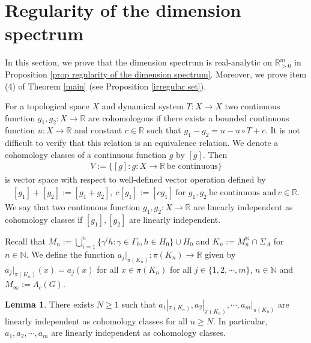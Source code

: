 \documentclass{article}
\theoremstyle{definition}
\newtheorem{lemma}[thm]{Lemma}
\begin{document}
\section{Regularity of the dimension spectrum}\label{Regularity of the dimension spectrum on a open "good" set}
In this section, we prove that the dimension spectrum is real-analytic on $\mathbb{R}_{>0}^m$ in Proposition \ref{prop regularity of the dimension spectrum}. Moreover, we prove item (4) of Theorem \ref{main} (see Proposition \ref{irregular set}). %

For a topological space $X$ and dynamical system $T:X\rightarrow X$ two continuous function $g_1,g_2:X\rightarrow \mathbb{R}$ are cohomologous if there exists a bounded continuous function $u:X\rightarrow\mathbb{R}$ and constant $c\in\mathbb{R}$ such that $g_1-g_2=u-u\circ T+c$. It is not difficult to verify that this relation is  an equivalence relation. We denote a cohomology classes of a continuous function $g$ by $[g]$. Then 
\begin{align}\nonumber
V:=\lbrace[g]:g:X\rightarrow\mathbb{R}\ \text{be\ continuous}\rbrace  
\end{align}
is vector space with respect to well-defined vector operation defined by 
\begin{align}\nonumber
   [g_1]+[g_2]:=[g_1+g_2],\ c[g_1]:=[cg_1]\ \text{for\ }g_1,g_2\ \text{be\ continuous\ and}\ c\in\mathbb{R}. 
\end{align}
We say that two continuous function $g_1,g_2:X\rightarrow \mathbb{R}$ are linearly independent as cohomology classes if $[g_1],[g_2]$ are linearly independent.



Recall that $M_n:=\bigcup_{i=1}^n\lbrace\gamma^ih:\gamma\in\Gamma_0,h\in H_0\rbrace\cup H_0$ and $K_n:=M_n^{\mathbb{N}}\cap\Sigma_A$
for $n\in\mathbb{N}$. We define the function $a_j|_{\pi(K_n)}:\pi(K_n)\rightarrow \mathbb{R}$ given by $a_j|_{\pi(K_n)}(x)=a_j(x)$ for all $x\in \pi(K_n) $ for all $j\in\{1,2,\cdots,m\}$, $n\in\mathbb{N}$ and $M_{\infty}:=\Lambda_c(G)$. 


\begin{lemma}\label{cohology}
There exists $N\geq1$ such that $a_1|_{\pi(K_n)},a_2|_{\pi(K_n)},\cdots,a_m|_{\pi(K_n)}$ are linearly independent as cohomology classes for all $n\geq N$. In particular, $a_1,a_2,\cdots,a_m$ are linearly independent as cohomology classes.
\end{lemma}
\end{document}
